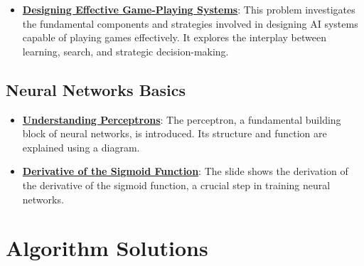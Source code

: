 \documentclass{article}%
\begin{document}
\begin{itemize}[leftmargin=*]
\item \href{https://purdue.brightspace.com/d2l/common/assets/pdfjs-d2l-dist/1.0.14-legacy/web/viewer.html?file=\%2Fcontent\%2Fenforced\%2F1095467-wl.202510.CS.24300.001\%2F02L2-Intro.pdf\%3Fou\%3D1095467\&lang=en-us\&container=d2l-fileviewer-rendered-pdf\&fullscreen=d2l-fileviewer-rendered-pdf-dialog\&height=667#page=47}{\textbf{Designing Effective Game{-}Playing Systems}}: This problem investigates the fundamental components and strategies involved in designing AI systems capable of playing games effectively. It explores the interplay between learning, search, and strategic decision{-}making.%
\end{itemize}

%
\subsection{Neural Networks Basics}%
\label{subsec:NeuralNetworksBasics}%
\begin{itemize}[leftmargin=*]%
\item \href{https://purdue.brightspace.com/d2l/common/assets/pdfjs-d2l-dist/1.0.14-legacy/web/viewer.html?file=\%2Fcontent\%2Fenforced\%2F1095467-wl.202510.CS.24300.001\%2F04L1-Linear Algebra Primer.pdf\%3Fou\%3D1095467\&lang=en-us\&container=d2l-fileviewer-rendered-pdf\&fullscreen=d2l-fileviewer-rendered-pdf-dialog\&height=667#page=17}{\textbf{Understanding Perceptrons}}: The perceptron, a fundamental building block of neural networks, is introduced. Its structure and function are explained using a diagram.%
\item \href{https://purdue.brightspace.com/d2l/common/assets/pdfjs-d2l-dist/1.0.14-legacy/web/viewer.html?file=\%2Fcontent\%2Fenforced\%2F1095467-wl.202510.CS.24300.001\%2F04L1-Linear Algebra Primer.pdf\%3Fou\%3D1095467\&lang=en-us\&container=d2l-fileviewer-rendered-pdf\&fullscreen=d2l-fileviewer-rendered-pdf-dialog\&height=667#page=21}{\textbf{Derivative of the Sigmoid Function}}: The slide shows the derivation of the derivative of the sigmoid function, a crucial step in training neural networks.%
\end{itemize}

%
\section{Algorithm Solutions}%
\label{sec:AlgorithmSolutions}%
\end{document}
